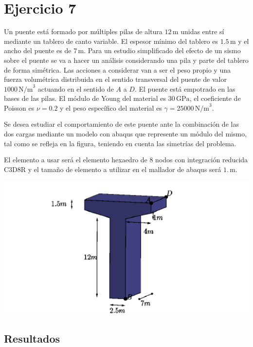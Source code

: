 \documentclass[a4paper,12pt]{article}
\begin{document}
\clearpage
\section{Ejercicio 7}
\label{sec:probprop4}


Un puente está formado por múltiples pilas de altura $12\,\text{m}$ unidas entre sí mediante un tablero de canto variable. El espesor mínimo del tablero es $1.5\,\text{m}$ y el 
ancho del puente es de $7\,\text{m}$. Para un estudio simplificado del efecto de un sismo sobre el puente se va a hacer
un análisis considerando una pila y parte del tablero de forma simétrica. 
Las acciones a considerar van a ser el peso propio y una fuerza volumétrica distribuida en el sentido 
transversal del puente de valor $1000\,\text{N/m}^{3}$ actuando en el sentido de $A$ a $D$.
El puente está empotrado en las bases de las pilas. 
El módulo de Young del material es $30\,\text{GPa}$, el coeficiente de Poisson es $\nu=0.2$ y el peso específico 
del material es $\gamma=25000\,\text{N/m}^{3}$.

Se desea estudiar el comportamiento de este puente ante la combinación de las dos cargas
mediante un modelo con abaqus que represente un módulo del mismo, tal como se refleja en la figura,  teniendo en cuenta las simetrías del problema.

El elemento a usar será el elemento hexaedro de 8 nodos con integración reducida C3D8R y el tamaño de elemento a utilizar 
en el mallador de abaqus será $1.\,\text{m}$.


\begin{center}
\includegraphics[width=1.2\textwidth]{puente3.pdf}
\end{center}


\subsection{Resultados}
\end{document}
